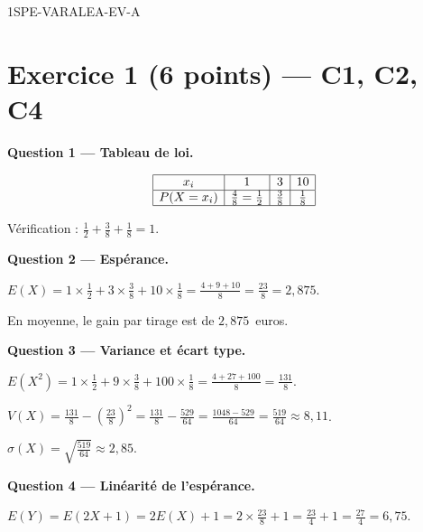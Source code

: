 \begin{corrige}{1SPE-VARALEA-EV-A}

\section*{Exercice 1 \hfill (6 points) — C1, C2, C4}


\bigskip
\textbf{Question 1 — Tableau de loi.}


\[
\begin{array}{|c|c|c|c|}
\hline
x_i & 1 & 3 & 10 \\
\hline
P(X=x_i) & \frac{4}{8} = \frac{1}{2} & \frac{3}{8} & \frac{1}{8} \\
\hline
\end{array}
\]

Vérification : $\frac{1}{2} + \frac{3}{8} + \frac{1}{8} = 1$. \checkmark

\medskip
\textbf{Question 2 — Espérance.}


$E(X) = 1 \times \frac{1}{2} + 3 \times \frac{3}{8} + 10 \times \frac{1}{8} = \frac{4+9+10}{8} = \frac{23}{8} = 2{,}875$.

En moyenne, le gain par tirage est de $2{,}875$~euros.

\medskip
\textbf{Question 3 — Variance et écart type.}


$E(X^2) = 1 \times \frac{1}{2} + 9 \times \frac{3}{8} + 100 \times \frac{1}{8} = \frac{4+27+100}{8} = \frac{131}{8}$.

$V(X) = \frac{131}{8} - \left(\frac{23}{8}\right)^2 = \frac{131}{8} - \frac{529}{64} = \frac{1048-529}{64} = \frac{519}{64} \approx 8{,}11$.

$\sigma(X) = \sqrt{\frac{519}{64}} \approx 2{,}85$.

\medskip
\textbf{Question 4 — Linéarité de l'espérance.}


$E(Y) = E(2X + 1) = 2E(X) + 1 = 2 \times \frac{23}{8} + 1
= \frac{23}{4} + 1 = \frac{27}{4} = 6{,}75$.


\end{corrige}
